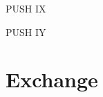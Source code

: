\documentclass[12pt,twoside,openright,a4paper]{book}
\begin{document}
\begin{minipage}{\textwidth}
\begin{instrtable}
	\begin{instruction}{PUSH IX} 
			\FlagsPUSHrr
		\SkipToSymbol
			\FromSymbolToOpCode
		\SkipToSymbol
	\end{instruction}
	
	\begin{lastinstruction}{PUSH IY} 
			\FlagsPUSHrr
		\SkipToSymbol
			\FromSymbolToOpCode
		\SkipToSymbol
	\end{lastinstruction}
	
\end{instrtable}

\NoteTableSingleItemSpaceCorrection

\begin{notestable}
\end{notestable}

\end{minipage}


\section{Exchange}
\end{document}
